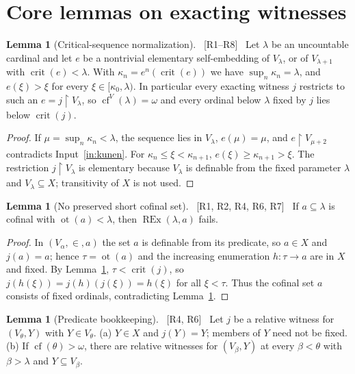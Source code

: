 \documentclass[11pt,letterpaper]{article}
\theoremstyle{definition}
\newtheorem{lemma}[definition]{Lemma}
\numberwithin{equation}{section}
\newcommand{\REx}{\operatorname{REx}}
\newcommand{\crit}{\operatorname{crit}}
\newcommand{\cf}{\operatorname{cf}}
\newcommand{\ot}{\operatorname{ot}}
\newcommand{\restr}{\mathbin{\upharpoonright}}
\newcommand{\src}[1]{\unskip\ {\normalfont\small\sffamily\color{Olive}[#1]}\ }
\begin{document}
\section{Core lemmas on exacting witnesses}\label{sec:core}

\begin{lemma}[Critical-sequence normalization]\label{lem:crit}\src{R1--R8}
Let $\lambda$ be an uncountable cardinal and let $e$ be a nontrivial elementary self-embedding of $V_\lambda$, or of $V_{\lambda+1}$ with $\crit(e)<\lambda$. With $\kappa_n=e^n(\crit(e))$ we have $\sup_n\kappa_n=\lambda$, and $e(\xi)>\xi$ for every $\xi\in[\kappa_0,\lambda)$. In particular every exacting witness $j$ restricts to such an $e=j\restr V_\lambda$, so $\cf^V(\lambda)=\omega$ and every ordinal below $\lambda$ fixed by $j$ lies below $\crit(j)$.
\end{lemma}

\begin{proof}
If $\mu=\sup_n\kappa_n<\lambda$, the sequence lies in $V_\lambda$, $e(\mu)=\mu$, and $e\restr V_{\mu+2}$ contradicts Input~\ref{in:kunen}. For $\kappa_n\le\xi<\kappa_{n+1}$, $e(\xi)\ge\kappa_{n+1}>\xi$. The restriction $j\restr V_\lambda$ is elementary because $V_\lambda$ is definable from the fixed parameter $\lambda$ and $V_\lambda\subseteq X$; transitivity of $X$ is not used.
\end{proof}

\begin{lemma}[No preserved short cofinal set]\label{lem:short}\src{R1, R2, R4, R6, R7}
If $a\subseteq\lambda$ is cofinal with $\ot(a)<\lambda$, then $\REx(\lambda,a)$ fails.
\end{lemma}

\begin{proof}
In $(V_\alpha,\in,a)$ the set $a$ is definable from its predicate, so $a\in X$ and $j(a)=a$; hence $\tau=\ot(a)$ and the increasing enumeration $h:\tau\to a$ are in $X$ and fixed. By Lemma~\ref{lem:crit}, $\tau<\crit(j)$, so $j(h(\xi))=j(h)(j(\xi))=h(\xi)$ for all $\xi<\tau$. Thus the cofinal set $a$ consists of fixed ordinals, contradicting Lemma~\ref{lem:crit}.
\end{proof}

\begin{lemma}[Predicate bookkeeping]\label{lem:descent}\src{R4, R6}
Let $j$ be a relative witness for $(V_\theta,Y)$ with $Y\in V_\theta$. (a) $Y\in X$ and $j(Y)=Y$; members of $Y$ need not be fixed. (b) If $\cf(\theta)>\omega$, there are relative witnesses for $(V_\beta,Y)$ at every $\beta<\theta$ with $\beta>\lambda$ and $Y\subseteq V_\beta$.
\end{lemma}
\end{document}
